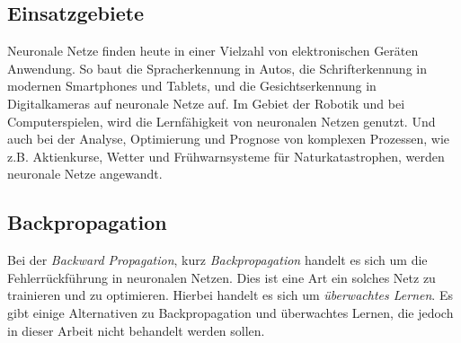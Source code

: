 \subsection{Einsatzgebiete}
Neuronale Netze finden heute in einer Viel\-zahl von elektronischen Geräten An\-wen\-dung. So baut die Spracherkennung in Autos, die Schrifterkennung in modernen Smart\-phones und Tablets, und die Gesichtserkennung in Digitalkameras auf neuronale Netze auf. Im Gebiet der Robotik und bei Computerspielen, wird die Lernfähigkeit von neuronalen Netzen genutzt. Und auch bei der Analyse, Optimierung und Prognose von komplexen Prozessen, wie z.B. Aktienkurse, Wetter und Frühwarnsysteme für Naturkatastrophen, werden neuronale Netze angewandt.

\subsection{Backpropagation}
Bei der \emph{Backward Propagation}, kurz \emph{Backpropagation} handelt es sich um die Fehlerrückführung in neuronalen Netzen. Dies ist eine Art ein solches Netz zu trainieren und zu optimieren. Hierbei handelt es sich um \emph{überwachtes Lernen}. Es gibt einige Alternativen zu Backpropagation und überwachtes Lernen, die jedoch in dieser Arbeit nicht behandelt werden sollen.
